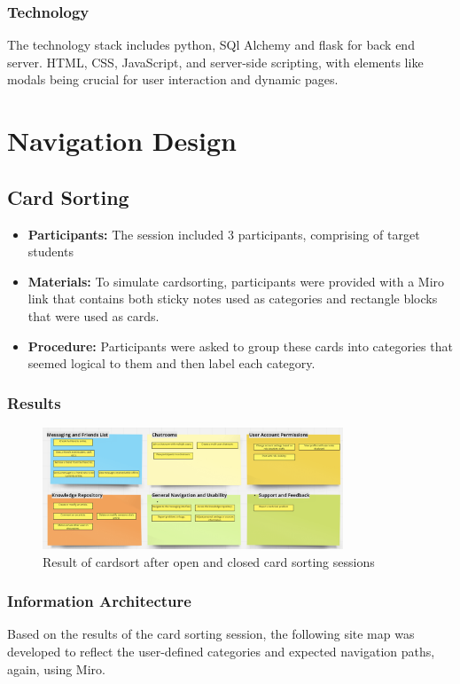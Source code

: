 \documentclass[12pt,a4paper]{article}
\begin{document}
\subsubsection*{Technology}
The technology stack includes python, SQl Alchemy and flask for back end server. HTML, CSS, JavaScript, and server-side scripting, with elements like modals being crucial for user interaction and dynamic pages. 

\section{Navigation Design }
\subsection*{Card Sorting}

\begin{itemize}
    \item \textbf{Participants:} The session included 3 participants, comprising of target students
    \item \textbf{Materials:} To simulate cardsorting, participants were provided with a Miro link that contains both sticky notes used as categories and rectangle blocks that were used as cards. 
    \item \textbf{Procedure:} Participants were asked to group these cards into categories that seemed logical to them and then label each category.
\end{itemize}

\subsubsection*{Results}
\begin{figure}[H]
\centering
\includegraphics[width=0.8\textwidth]{cardsort.png} 
\caption{Result of cardsort after open and closed card sorting sessions}
\label{fig:sitemap}
\end{figure}


\subsubsection*{Information Architecture}
Based on the results of the card sorting session, the following site map was developed to reflect the user-defined categories and expected navigation paths, again, using Miro.
\end{document}
